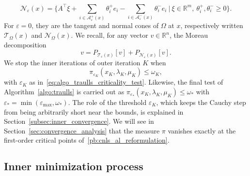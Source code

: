 \documentclass[pdflatex,sn-mathphys-num]{sn-jnl}%
\theoremstyle{thmstyleone}%
\newcommand{\RR}{{\mathbb{R}}} %
\newcommand{\calA}{{\mathcal{A}}}
\newcommand{\calN}{{\mathcal{N}}}
\newcommand{\calT}{{\mathcal{T}}}
\newcommand{\proj}[2]{P_{#1} \left[ {#2} \right]} %
\begin{document}
\begin{equation}\label{eq:normal_cone_eps}
	\calN_\varepsilon(x) = \bigg\{ A^\top\xi + \sum_{i \in \calA^+_\varepsilon(x)} \theta^+_i e_i - \sum_{i \in \calA^-_\varepsilon(x)} \theta^-_i e_i \ \Big|\ \xi\in\RR^m,\ \theta^+_i, \theta^-_i\ge0\bigg\}.
\end{equation}
For $\varepsilon = 0$, they are the tangent and normal cones of $\Omega$ at $x$, respectively written $\calT_\Omega(x)$ and $\calN_\Omega(x)$. We recall, for any vector $v \in \RR^n$, the Moreau decomposition
\begin{equation}\label{eq:moreau_decomposition}
	v = \proj{\calT_\varepsilon(x)}{v} + \proj{\calN_\varepsilon(x)}{v}.
\end{equation}
We stop the inner iterations of outer iteration $K$ when
\begin{equation}\label{eq:criticality_cond_reduced_grad}
	\pi_{\varepsilon_K}(x_K,\lambda_K,\mu_K) \le \omega_K,
\end{equation}
with $\varepsilon_K$ as in~\eqref{eq:algo_traulls_criticality_test}. Likewise, the final test of Algorithm~\ref{algo:traulls} is carried out as $\pi_{\varepsilon_*}(x_K,\lambda_K,\mu_K) \le \omega_*$ with $\varepsilon_* = \min(\varepsilon_{\max},\omega_*)$.
The role of the threshold $\varepsilon_K$, which keeps the Cauchy step from being arbitrarily short near the bounds, is explained in Section~\ref{subsec:inner_convergence}. We will see in Section~\ref{sec:convergence_analysis} that the measure $\pi$ vanishes exactly at the first-order critical points of~\eqref{pb:cnls_al_reformulation}. 

\subsection{Inner minimization process}\label{subsec:inner_iteration}
\end{document}
